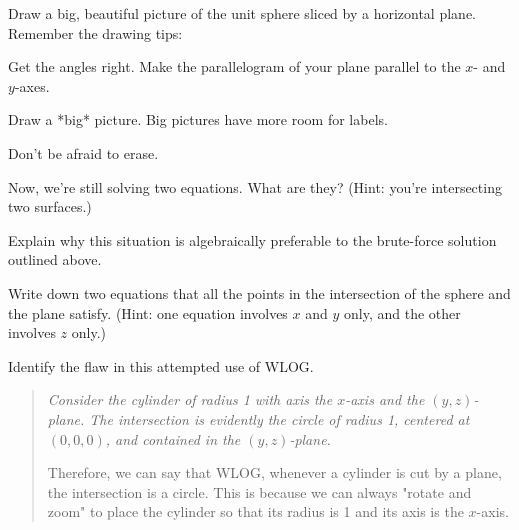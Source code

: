 \documentclass[12pt]{exam}
\theoremstyle{definition}
\begin{document}
\begin{questions}

\question Draw a big, beautiful picture of the unit sphere sliced by a horizontal plane. Remember the drawing tips:
\begin{compactitem}
    \item Get the angles right. Make the parallelogram of your plane parallel to the $x$- and $y$-axes.
    \item Draw a *big* picture. Big pictures have more room for labels.
    \item Don't be afraid to erase.
\end{compactitem}

\newpage

\question Now, we're still solving two equations. What are they? (Hint: you're intersecting two surfaces.)


\question Explain why this situation is algebraically preferable to the brute-force solution outlined above.


\question Write down two equations that all the points in the intersection of the sphere and the plane satisfy. (Hint: one equation involves $x$ and $y$ only, and the other involves $z$ only.)


\question Identify the flaw in this attempted use of WLOG.

\begin{quote}
    {\em Consider the cylinder of radius 1 with axis the $x$-axis and the $(y,z)$-plane. The intersection is evidently the circle of radius 1, centered at $(0,0,0)$, and contained in the $(y,z)$-plane. 

    Therefore, we can say that WLOG, whenever a cylinder is cut by a plane, the intersection is a circle. This is because we can always "rotate and zoom" to place the cylinder so that its radius is 1 and its axis is the $x$-axis.}
\end{quote}


\end{questions} 
\end{document}
